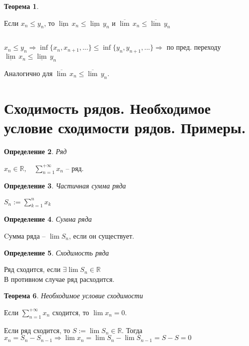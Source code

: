 \documentclass[12pt,letterpaper]{report}
\makeatletter
\newtheorem{theorem}{Теорема}
\newtheorem{conj}[theorem]{Определение}
\renewenvironment{proof}[1][\proofname]{%
   \par\pushQED{\qed}\normalfont%
   \topsep6\p@\@plus6\p@\relax
   \trivlist\item[\hskip\labelsep\bfseries#1\@addpunct{.}]%
   \ignorespaces
}{%
   \popQED\endtrivlist\@endpefalse
}
\makeatother
\begin{document}
\begin{theorem}\end{theorem}
Если $x_n \leq y_n$, то 
$\underline{\lim}\, x_n \leq \underline{\lim}\, y_n$ и  
$\overline{\lim}\, x_n \leq \overline{\lim}\, y_n$

\begin{proof} $ $

$x_n \leq y_n \Rightarrow \inf\{x_n, x_{n + 1}, ...\} \leq
\inf\{y_n, y_{n + 1}, ...\} \Rightarrow$ по пред. переходу 
$\underline{\lim}\, x_n \leq \underline{\lim}\, y_n$

Аналогично для $\overline{\lim}\, x_n \leq \overline{\lim}\, y_n$.
\end{proof}

\section{Сходимость рядов. Необходимое условие сходимости рядов. Примеры.}

\begin{conj}Ряд\end{conj}
$x_n \in \mathbb{R}, \quad \sum_{n=1}^{+\infty} x_n$ -- ряд.

\begin{conj}Частичная сумма ряда\end{conj}
$S_n := \sum_{k=1}^{n} x_k$

\begin{conj}Сумма ряда\end{conj}
Cумма ряда -- $\lim S_n$, если он существует.

\begin{conj}Сходимость ряда\end{conj}
Ряд сходится, если $\exists \lim S_n \in \mathbb{R}$\\
В противном случае ряд расходится.

\begin{theorem}
Необходимое условие сходимости
\end{theorem}
Если $\sum_{n = 1}^{+\infty} x_n$ сходится, то $\lim x_n = 0$.

\begin{proof}
    Если ряд сходится, то $S := \lim S_n \in \mathbb{R}$. Тогда
    $x_n = S_n - S_{n - 1} \Rightarrow \lim x_n = \lim S_n - 
    \lim S_{n - 1} = S - S = 0$
\end{proof}
\end{document}
